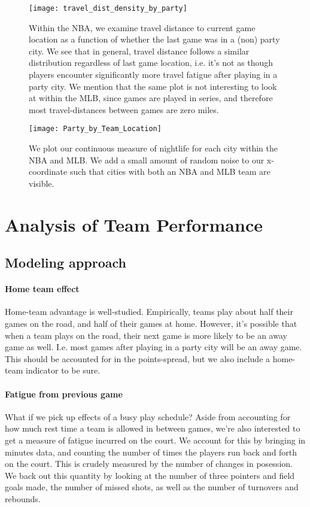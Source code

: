 \documentclass[letterpaper,12pt]{article}
\begin{document}
\begin{figure}
  \centering
  \texttt{[image: travel\_dist\_density\_by\_party]}
  \label{fig: density by party}
  \caption{Within the NBA, we examine travel distance to current game location as a function of
    whether the last game was in a (non) party city. We see that in general,
  travel distance follows a similar distribution regardless of last game location, i.e. 
  it's not as though players encounter significantly
  more travel fatigue after playing in a party city. We mention that the same plot is not interesting to look at within the MLB, since games are played in series, and therefore most travel-distances between games are zero miles.}
\end{figure}


\begin{figure}
  \centering
  \label{fig: party by team loc}
  \texttt{[image: Party\_by\_Team\_Location]}
  \caption{We plot our continuous measure of nightlife for each city within the NBA and MLB. We add a small amount of random noise to our x-coordinate such that cities
with both an NBA and MLB team are visible.}
\end{figure}



\section{Analysis of Team Performance}

\subsection{Modeling approach}

\paragraph{Home team effect}
Home-team advantage is well-studied.\citep{jones07, jones08}  
Empirically, teams play about half their games on the road, and half of their games at home. However,
it's possible that when a team plays on the road, their next game is more likely to be
an away game as well. I.e. most games after playing in a party city will be an away game.
This should be accounted for in the points-spread, but we also include
a home-team indicator to be sure.

\paragraph{Fatigue from previous game}
What if we pick up effects of a busy play schedule?
Aside from accounting for how much rest time a team is allowed in between games,
we're also interested to get a measure of
fatigue incurred on the court.
We account for this by bringing in minutes data, and counting the number of 
times the players run back and forth on the court. This is crudely measured
by the number of changes in posession. We back out this quantity by looking
at the number of three pointers and field goals made, the number of missed shots,
as well as the number of turnovers and rebounds.
\end{document}
